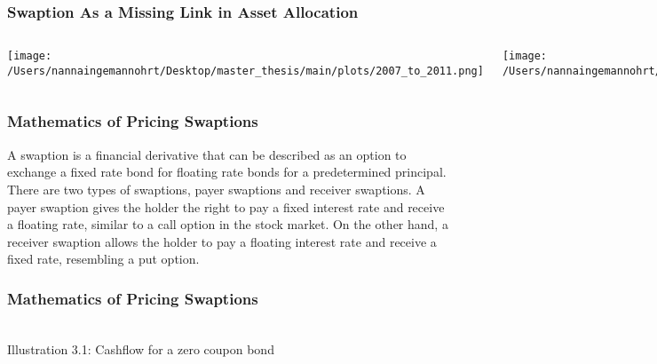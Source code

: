\documentclass{beamer}
\begin{document}
\begin{frame}
    \frametitle{\textcolor{KUrod}{Swaption As a Missing Link in Asset Allocation}}
    \begin{columns}
        \begin{center}
            \texttt{[image: /Users/nannaingemannohrt/Desktop/master\_thesis/main/plots/2007\_to\_2011.png]}
            \caption{ Global Financial Crisis}
        \end{center}

        \begin{center}
            \texttt{[image: /Users/nannaingemannohrt/Desktop/master\_thesis/main/plots/2022\_to\_2024.png]}
        \end{center}
    \end{columns}
\end{frame}

\begin{frame}
    \frametitle{\textcolor{KUrod}{Mathematics of Pricing Swaptions}}
    A swaption is a financial derivative that can be described as an option to exchange a fixed rate bond for
    floating rate bonds for a predetermined principal. 
    There are two types of swaptions, payer swaptions and receiver swaptions.
    A payer swaption gives the holder the right to pay a fixed interest rate and receive a floating rate, 
    similar to a call option in the stock market. On the other hand, a receiver swaption allows the holder
    to pay a floating interest rate and receive a fixed rate, resembling a put option.
\end{frame} 

\begin{frame}
    \frametitle{\textcolor{KUrod}{Mathematics of Pricing Swaptions}}
        \begin{center}
            \\[10pt] 
            Illustration 3.1: Cashflow for a zero coupon bond
        \end{center}
\end{frame}
\end{document}
